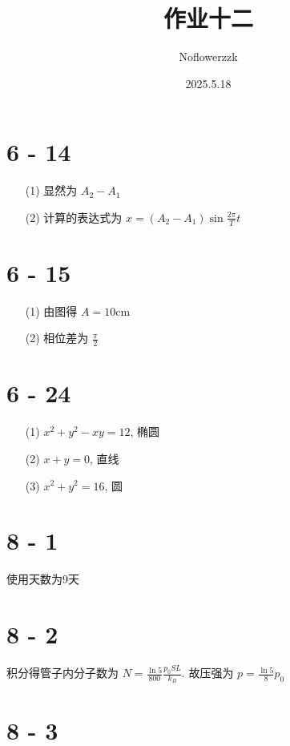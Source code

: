 \documentclass{article}
\title{作业十二}
\author{Noflowerzzk}
\date{2025.5.18}
\begin{document}
\maketitle

\section*{6 - 14}

\begin{itemize}
    \item [(1)] 显然为 $A_2 - A_1$
    \item [(2)] 计算的表达式为 $x = (A_2 - A_1)\sin\frac{2\pi}{T}t$
\end{itemize}

\section*{6 - 15}

\begin{itemize}
    \item [(1)] 由图得 $A = 10 \mathrm{cm}$
    \item [(2)] 相位差为 $\frac{\pi}{2}$
\end{itemize}

\section*{6 - 24}

\begin{itemize}
    \item [(1)] $x^2 + y^2 - xy = 12$, 椭圆
    \item [(2)] $x + y = 0$, 直线
    \item [(3)] $x^2 + y^2 = 16$, 圆
\end{itemize}

\section*{8 - 1}

使用天数为9天

\section*{8 - 2}

积分得管子内分子数为 $N = \frac{\ln 5}{800}\frac{p_0SL}{k_B}$. 故压强为 $p = \frac{\ln 5}{8}p_0$

\section*{8 - 3}
\end{document}
